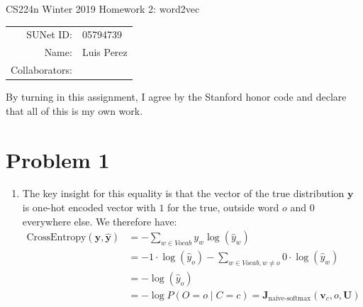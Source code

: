 \documentclass[12pt]{article}
\begin{document}
\begin{center}
{\Large CS224n Winter 2019 Homework 2: word2vec}

\begin{tabular}{rl}
SUNet ID: & 05794739 \\
Name: & Luis Perez \\
Collaborators: &
\end{tabular}
\end{center}

By turning in this assignment, I agree by the Stanford honor code and declare
that all of this is my own work.

\section*{Problem 1}
\begin{enumerate}[label=(\alph*)]
\item The key insight for this equality is that the vector of the true distribution $\bm{y}$ is one-hot encoded vector with $1$ for the true, outside word $o$ and $0$ everywhere else. We therefore have:
\begin{align*}
\text{CrossEntropy}(\bm{y}, \bm{\hat{y}}) &= - \sum_{w \in Vocab} y_w \log(\hat{y}_w) \\
&= -1 \cdot \log(\hat{y}_o) - \sum_{w \in Vocab, w \neq o} 0 \cdot \log(\hat{y}_w)\\
&= -\log(\hat{y}_o) \\
&= -\log P(O = o \mid C = c) = \bm{J}_{\text{naive-softmax}}(\bm{v}_c, o, \bm{U})
\end{align*}


\end{enumerate}
\end{document}
